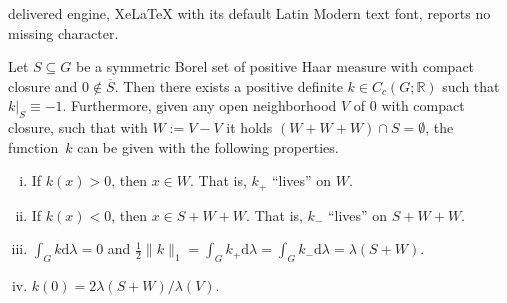 \documentclass[10pt,a4paper]{amsart}
\def\dd{\mathrm{d}}
\def\haar{\lambda}
\newcommand{\RR}{\mathbb R}
\begin{document}
delivered engine, XeLaTeX with its default Latin Modern text font, reports no missing character.
\begin{lemma}\label{l:signswap}
	 Let $S \subseteq  G$ be a symmetric Borel set of positive Haar measure  with compact closure and $0 \not\in \overline{S}$.
Then there exists a positive definite $k \in C_c(G;\RR)$ such that $k|_S \equiv -1$.
Furthermore, given any open neighborhood $V$ of $0$ with compact closure, such that with $W:=V-V$ it holds $(W+W+W) \cap S = \emptyset$, the function~$k$ can be given with the following properties.
\begin{enumerate}[(i)]
  \item If $k(x)>0$, then $x \in W$. That is, $k_{+}$ ``lives'' on $W$.
  \item If $k(x)<0$, then $x \in S+W+W$. That is, $k_{-}$ ``lives'' on $S+W+W$.
  \item $\int_G k\dd\haar =0$ and $\frac12 \| k\|_1 = \int_G k_{+}\dd\haar = \int_G k_{-}\dd\haar = \lambda(S+W)$.
  \item $k(0)=2 \lambda(S+W)/\lambda(V)$.
  \end{enumerate}
\end{lemma}
\end{document}
